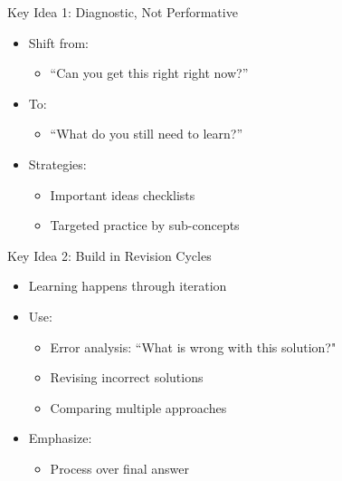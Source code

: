 \documentclass[dvipsnames]{beamer}
\begin{document}
\begin{frame}{Key Idea 1: Diagnostic, Not Performative}
\begin{itemize}
    \item Shift from:
    \begin{itemize}
        \item ``Can you get this right right now?''
    \end{itemize}
    
    \item To:
    \begin{itemize}
        \item ``What do you still need to learn?''
    \end{itemize}
    
    \item Strategies:
    \begin{itemize}
        \item Important ideas checklists
        \item Targeted practice by sub-concepts
    \end{itemize}
\end{itemize}
\end{frame}

\begin{frame}{Key Idea 2: Build in Revision Cycles}
\begin{itemize}
    \item Learning happens through iteration
    \item Use:
    \begin{itemize}
        \item Error analysis: ``What is wrong with this solution?"
        \item Revising incorrect solutions
        \item Comparing multiple approaches
    \end{itemize}
    
    \item Emphasize:
    \begin{itemize}
        \item Process over final answer
    \end{itemize}
\end{itemize}
\end{frame}
\end{document}
